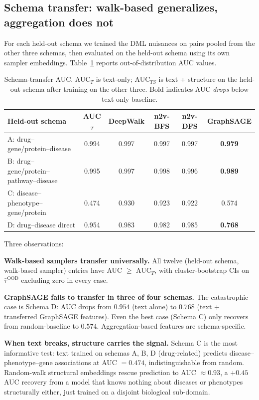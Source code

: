 \documentclass[11pt]{article}
\begin{document}
\subsection{Schema transfer: walk-based generalizes, aggregation does not}
\label{sec:transfer}

For each held-out schema we trained the DML nuisances on pairs pooled from the other three schemas, then evaluated on the held-out schema using its own sampler embeddings. Table~\ref{tab:transfer} reports out-of-distribution AUC values.

\begin{table}[h!]
\centering
\caption{Schema-transfer AUC. AUC$_T$ is text-only; AUC$_{TS}$ is text + structure on the held-out schema after training on the other three. Bold indicates AUC \emph{drops} below text-only baseline.}
\label{tab:transfer}
\small
\begin{tabular}{l c c c c c}
\toprule
Held-out schema & AUC$_T$ & DeepWalk & n2v-BFS & n2v-DFS & GraphSAGE \\
\midrule
A: drug--gene/protein--disease & 0.994 & 0.997 & 0.997 & 0.997 & \textbf{0.979} \\
B: drug--gene/protein--pathway--disease & 0.995 & 0.997 & 0.998 & 0.996 & \textbf{0.989} \\
C: disease--phenotype--gene/protein & 0.474 & 0.930 & 0.923 & 0.922 & 0.574 \\
D: drug--disease direct & 0.954 & 0.983 & 0.982 & 0.985 & \textbf{0.768} \\
\bottomrule
\end{tabular}
\end{table}

Three observations:

\textbf{Walk-based samplers transfer universally.} All twelve (held-out schema, walk-based sampler) entries have AUC $\geq$ AUC$_T$, with cluster-bootstrap CIs on $\bar\tau^{\mathrm{OOD}}$ excluding zero in every case.

\textbf{GraphSAGE fails to transfer in three of four schemas.} The catastrophic case is Schema D: AUC drops from $0.954$ (text alone) to $0.768$ (text + transferred GraphSAGE features). Even the best case (Schema C) only recovers from random-baseline to $0.574$. Aggregation-based features are schema-specific.

\textbf{When text breaks, structure carries the signal.} Schema C is the most informative test: text trained on schemas A, B, D (drug-related) predicts disease--phenotype--gene associations at AUC $= 0.474$, indistinguishable from random. Random-walk structural embeddings rescue prediction to AUC $\approx 0.93$, a $+0.45$ AUC recovery from a model that knows nothing about diseases or phenotypes structurally either, just trained on a disjoint biological sub-domain.
\end{document}

